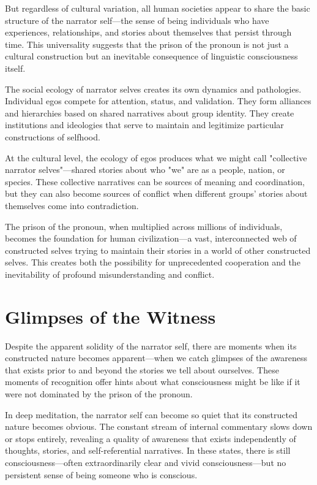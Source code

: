 But regardless of cultural variation, all human societies appear to share the basic structure of the narrator self—the sense of being individuals who have experiences, relationships, and stories about themselves that persist through time. This universality suggests that the prison of the pronoun is not just a cultural construction but an inevitable consequence of linguistic consciousness itself.

The social ecology of narrator selves creates its own dynamics and pathologies. Individual egos compete for attention, status, and validation. They form alliances and hierarchies based on shared narratives about group identity. They create institutions and ideologies that serve to maintain and legitimize particular constructions of selfhood.

At the cultural level, the ecology of egos produces what we might call "collective narrator selves"—shared stories about who "we" are as a people, nation, or species. These collective narratives can be sources of meaning and coordination, but they can also become sources of conflict when different groups' stories about themselves come into contradiction.

The prison of the pronoun, when multiplied across millions of individuals, becomes the foundation for human civilization—a vast, interconnected web of constructed selves trying to maintain their stories in a world of other constructed selves. This creates both the possibility for unprecedented cooperation and the inevitability of profound misunderstanding and conflict.

\section{Glimpses of the Witness}

Despite the apparent solidity of the narrator self, there are moments when its constructed nature becomes apparent—when we catch glimpses of the awareness that exists prior to and beyond the stories we tell about ourselves. These moments of recognition offer hints about what consciousness might be like if it were not dominated by the prison of the pronoun.

In deep meditation, the narrator self can become so quiet that its constructed nature becomes obvious. The constant stream of internal commentary slows down or stops entirely, revealing a quality of awareness that exists independently of thoughts, stories, and self-referential narratives. In these states, there is still consciousness—often extraordinarily clear and vivid consciousness—but no persistent sense of being someone who is conscious.

